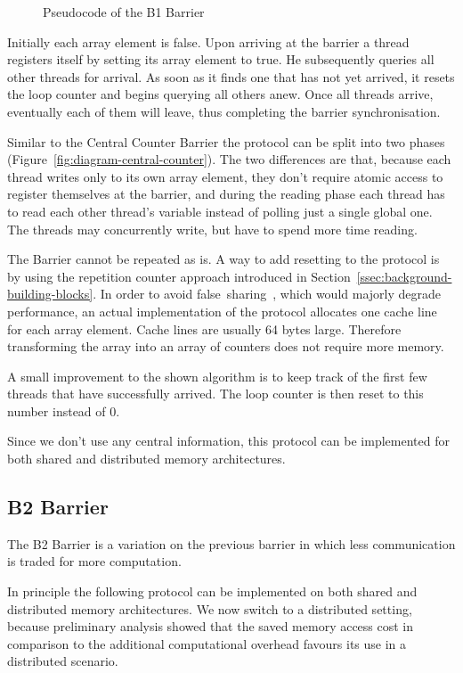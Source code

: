\documentclass[a4paper, 10pt]{article}
\begin{document}
\begin{figure}[htbp]
	\centering
	
	\caption{Pseudocode of the B1 Barrier}
	\label{fig:pseudocode-b1}
\end{figure}

Initially each array element is false. Upon arriving at the barrier a thread registers itself by setting its array element to true. He subsequently queries all other threads for arrival. As soon as it finds one that has not yet arrived, it resets the loop counter and begins querying all others anew. Once all threads arrive, eventually each of them will leave, thus completing the barrier synchronisation.

Similar to the Central Counter Barrier the protocol can be split into two phases (Figure~\ref{fig:diagram-central-counter}).
The two differences are that, because each thread writes only to its own array element, they don't require atomic access to register themselves at the barrier, and during the reading phase each thread has to read each other thread's variable instead of polling just a single global one. The threads may concurrently write, but have to spend more time reading.

The Barrier cannot be repeated as is. A way to add resetting to the protocol is by using the repetition counter approach introduced in Section~\ref{ssec:background-building-blocks}. In order to avoid false~sharing~\cite{falsesharing}, which would majorly degrade performance, an actual implementation of the protocol allocates one cache line for each array element. Cache lines are usually 64 bytes large. Therefore transforming the array into an array of counters does not require more memory.

A small improvement to the shown algorithm is to keep track of the first few threads that have successfully arrived. The loop counter is then reset to this number instead of 0.

Since we don't use any central information, this protocol can be implemented for both shared and distributed memory architectures.

\subsection{B2 Barrier}
\label{ssec:new-b2}
The B2 Barrier is a variation on the previous barrier in which less communication is traded for more computation.

In principle the following protocol can be implemented on both shared and distributed memory architectures. We now switch to a distributed setting, because preliminary analysis showed that the saved memory access cost in comparison to the additional computational overhead favours its use in a distributed scenario.
\end{document}
